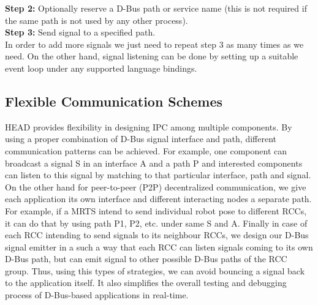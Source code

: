\documentclass[draft]{ifacconf}
\begin{document}
\textbf{Step 2:} Optionally reserve a D-Bus path or service name (this is not required if the same path is not used by any other process).\\
\textbf{Step 3:} Send signal to a specified path. \\
In order to add more signals we just need to repeat step 3 as many times as we need. On the other hand, signal listening can be done by setting up a suitable event loop under any supported language bindings.
\subsection{Flexible Communication  Schemes}
HEAD provides flexibility in designing IPC among multiple components. By using a proper combination of D-Bus signal interface and path, different communication patterns can be achieved. For example, one component can broadcast a signal S in an interface A and a path P and interested components can listen to this signal by matching to that particular interface, path and signal. On the other hand for peer-to-peer (P2P) decentralized communication,  we give each application its own interface and different interacting nodes a separate path.  For example, if a MRTS intend to send individual robot pose to different RCCs, it can do that by using path P1,  P2, etc. under same S and A. Finally in case of each RCC intending to send signals to its neighbour RCCs, we design our D-Bus signal emitter in a such a way that each RCC can listen signals coming to its own D-Bus path, but can emit  signal to other possible D-Bus paths of the RCC group. Thus, using this types of strategies, we can avoid bouncing a signal back to the application itself. It also simplifies the overall testing and debugging process of D-Bus-based applications in real-time. 
\end{document}
